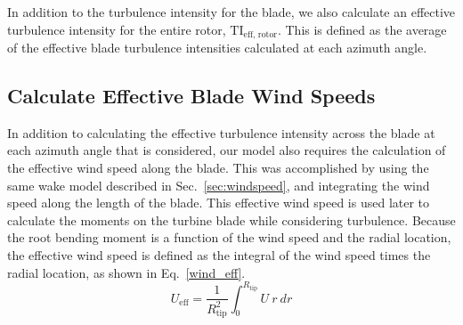 \documentclass[11pt,letterpaper]{article}
\begin{document}
In addition to the turbulence intensity for the blade, we also calculate an effective turbulence intensity for the entire rotor, $\text{TI}_{\text{eff, rotor}}$. This is defined as the average of the effective blade turbulence intensities calculated at each azimuth angle.

\subsection{Calculate Effective Blade Wind Speeds}

In addition to calculating the effective turbulence intensity across the blade at each azimuth angle that is considered, our model also requires the calculation of the effective wind speed along the blade. This was accomplished by using the same wake model described in Sec.~\ref{sec:windspeed}, and integrating the wind speed along the length of the blade. This effective wind speed is used later to calculate the moments on the turbine blade while considering turbulence. Because the root bending moment is a function of the wind speed and the radial location, the effective wind speed is defined as the integral of the wind speed times the radial location, as shown in Eq.~\ref{wind_eff}.
\begin{equation}
    \label{wind_eff}
    U_\text{eff} = \frac{1}{R_\text{tip}^2}\int_0^{R_\text{tip}}U~ r~ dr
\end{equation}
\end{document}
